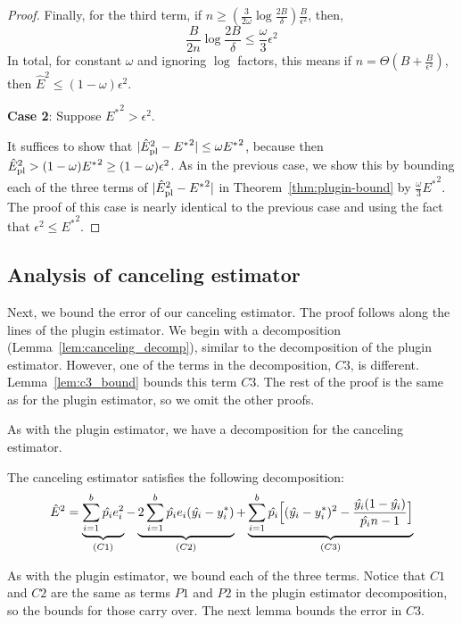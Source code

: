 \begin{proof}
Finally, for the third term, if $n \geq (\frac{3}{2\omega} \log{\frac{2B}{\delta}}) \frac{B}{\epsilon^2}$, then,
\[ \frac{B}{2n} \log{\frac{2B}{\delta}} \leq \frac{\omega}{3}\epsilon^2 \]
In total, for constant $\omega$ and ignoring $\log$ factors, this means if $n = \Theta(B + \frac{B}{\epsilon^2})$, then $\hat{E}^2 \leq (1-\omega) \epsilon^2$.

\textbf{Case 2}: Suppose ${E^*}^2 > \epsilon^2$.

It suffices to show that $| \hat{E}_{\textup{pl}}^2{} - {E^*}^2 | \leq \omega {E^*}^2$, because then $\hat{E}_{\textup{pl}}^2{} > (1 - \omega) {E^*}^2 \geq (1 - \omega) \epsilon^2$. As in the previous case, we show this by bounding each of the three terms of  $| \hat{E}_{\textup{pl}}^2{} - {E^*}^2 |$ in Theorem~\ref{thm:plugin-bound} by $\frac{\omega}{3}{E^*}^2$. The proof of this case is nearly identical to the previous case and using the fact that $\epsilon^2 \leq {E^*}^2$.

\end{proof}

\subsection{Analysis of canceling estimator}

Next, we bound the error of our canceling estimator. The proof follows along the lines of the plugin estimator. We begin with a decomposition (Lemma~\ref{lem:canceling_decomp}), similar to the decomposition of the plugin estimator. However, one of the terms in the decomposition, $C3$, is different. Lemma~\ref{lem:c3_bound} bounds this term $C3$. The rest of the proof is the same as for the plugin estimator, so we omit the other proofs.

As with the plugin estimator, we have a decomposition for the canceling estimator.

\begin{lemma}
\label{lem:canceling_decomp}
The canceling estimator satisfies the following decomposition:
\[ \hat{E}^2{} = \underbrace{\sum_{i=1}^b \hat{p_i}e_i^2}_{(C1)}  - \underbrace{2\sum_{i=1}^b \hat{p_i}e_i(\hat{y_i} - y_i^*)}_{(C2)} + \underbrace{\sum_{i=1}^b \hat{p_i}\Big[ (\hat{y_i} - y_i^*)^2 - \frac{\hat{y_i}(1 - \hat{y_i})}{\hat{p_i}n-1} \Big]}_{(C3)} \]
\end{lemma}

As with the plugin estimator, we bound each of the three terms. Notice that $C1$ and $C2$ are the same as terms $P1$ and $P2$ in the plugin estimator decomposition, so the bounds for those carry over. The next lemma bounds the error in $C3$.

